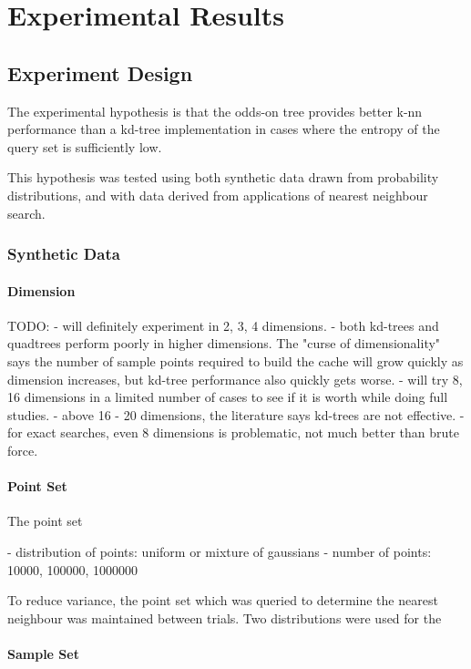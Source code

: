 \documentclass[mcs]{scsthesis}
\begin{document}
\chapter{Experimental Results}


\section{Experiment Design}

The experimental hypothesis is that the odds-on tree provides better k-nn
performance than a kd-tree implementation in cases where the entropy of the
query set is sufficiently low.

This hypothesis was tested using both synthetic data drawn from probability
distributions, and with data derived from applications of nearest neighbour
search. 

\subsection{Synthetic Data}

\subsubsection{Dimension}

TODO:
- will definitely experiment in 2, 3, 4 dimensions.
- both kd-trees and quadtrees perform poorly in higher dimensions.  The "curse
of dimensionality" says the number of sample points required to build the cache
will grow quickly as dimension increases, but kd-tree performance also quickly
gets worse.
- will try 8, 16 dimensions in a limited number of cases to see if it is worth
while doing full studies.
- above 16 - 20 dimensions, the literature says kd-trees are not effective.
- for exact searches, even 8 dimensions is problematic, not much better than
brute force. 

\subsubsection{Point Set}

The point set

- distribution of points: uniform or mixture of gaussians
- number of points: 10000, 100000, 1000000 

To reduce variance, the point set which was queried to determine the nearest
neighbour was maintained between trials.  Two distributions were used for the

\subsubsection{Sample Set}
\end{document}
